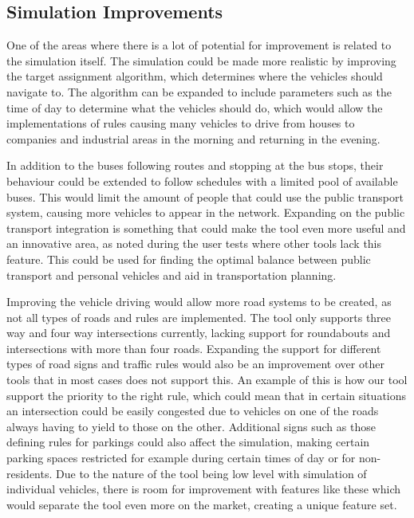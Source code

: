     \subsection{Simulation Improvements}
        One of the areas where there is a lot of potential for improvement is related to the simulation itself. The simulation could be made more realistic by improving the target assignment algorithm, which determines where the vehicles should navigate to. The algorithm can be expanded to include parameters such as the time of day to determine what the vehicles should do, which would allow the implementations of rules causing many vehicles to drive from houses to companies and industrial areas in the morning and returning in the evening.
        
        In addition to the buses following routes and stopping at the bus stops, their behaviour could be extended to follow schedules with a limited pool of available buses. This would limit the amount of people that could use the public transport system, causing more vehicles to appear in the network. Expanding on the public transport integration is something that could make the tool even more useful and an innovative area, as noted during the user tests where other tools lack this feature. This could be used for finding the optimal balance between public transport and personal vehicles and aid in transportation planning.

        Improving the vehicle driving would allow more road systems to be created, as not all types of roads and rules are implemented. The tool only supports three way and four way intersections currently, lacking support for roundabouts and intersections with more than four roads. Expanding the support for different types of road signs and traffic rules would also be an improvement over other tools that in most cases does not support this. An example of this is how our tool support the priority to the right rule, which could mean that in certain situations an intersection could be easily congested due to vehicles on one of the roads always having to yield to those on the other. Additional signs such as those defining rules for parkings could also affect the simulation, making certain parking spaces restricted for example during certain times of day or for non-residents. Due to the nature of the tool being low level with simulation of individual vehicles, there is room for improvement with features like these which would separate the tool even more on the market, creating a unique feature set.

